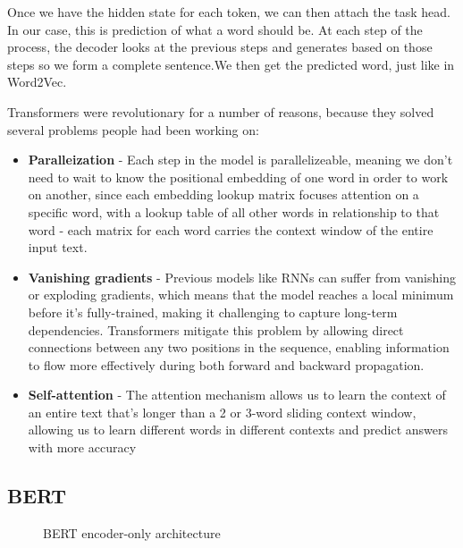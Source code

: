\documentclass[11pt, table]{diazessay} %
\begin{document}
\begin{sloppypar}
Once we have the hidden state for each token, we can then attach the task head. In our case, this is prediction of what a word should be.  At each step of the process, the decoder looks at the previous steps and generates based on those steps so we form a complete sentence\citep{rush2018annotated}.We then get the predicted word, just like in Word2Vec.

Transformers were revolutionary for a number of reasons, because they solved several problems people had been working on: 
\begin{itemize}
\item\textbf{Paralleization} - Each step in the model is parallelizeable, meaning we don't need to wait to know the positional embedding of one word in order to work on another, since each embedding lookup matrix focuses attention on a specific word, with a lookup table of all other words in relationship to that word - each matrix for each word carries the context window of the entire input text. 
\item\textbf{Vanishing gradients} - Previous models like RNNs can suffer from vanishing or exploding gradients, which means that the model reaches a local minimum before it's fully-trained, making it challenging to capture long-term dependencies. Transformers mitigate this problem by allowing direct connections between any two positions in the sequence, enabling information to flow more effectively during both forward and backward propagation.
\item\textbf{Self-attention} - The attention mechanism allows us to learn the context of an entire text that's longer than a 2 or 3-word sliding context window, allowing us to learn different words in different contexts and predict answers with more accuracy
\end{itemize}


\subsection{BERT}

\begin{figure}[H]
\caption{BERT encoder-only architecture}
\end{figure}


\end{sloppypar}
\end{document}
